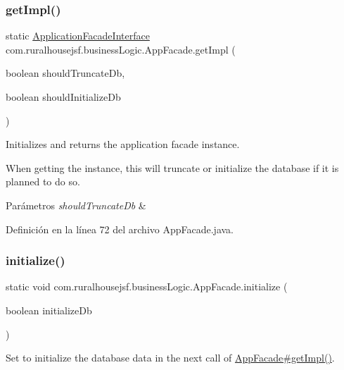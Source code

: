 \subsubsection{\texorpdfstring{getImpl()}{getImpl()}\hspace{0.1cm}{\footnotesize\ttfamily [3/3]}}
{\footnotesize\ttfamily static \mbox{\hyperlink{a00136}{Application\+Facade\+Interface}} com.\+ruralhousejsf.\+business\+Logic.\+App\+Facade.\+get\+Impl (\begin{DoxyParamCaption}\item[{boolean}]{should\+Truncate\+Db,  }\item[{boolean}]{should\+Initialize\+Db }\end{DoxyParamCaption})\hspace{0.3cm}{\ttfamily [static]}}



Initializes and returns the application facade instance. 

When getting the instance, this will truncate or initialize the database if it is planned to do so.


\begin{DoxyParams}{Parámetros}
{\em should\+Truncate\+Db} & \\
\hline
\end{DoxyParams}


Definición en la línea 72 del archivo App\+Facade.\+java.

\mbox{\label{a00128_a48252ec119a6bb16f5353df6ec6eff54}} 
\subsubsection{\texorpdfstring{initialize()}{initialize()}}
{\footnotesize\ttfamily static void com.\+ruralhousejsf.\+business\+Logic.\+App\+Facade.\+initialize (\begin{DoxyParamCaption}\item[{boolean}]{initialize\+Db }\end{DoxyParamCaption})\hspace{0.3cm}{\ttfamily [static]}}



Set to initialize the database data in the next call of \mbox{\hyperlink{a00128_a029bcceee98b9070b9f80abc54db45d6}{App\+Facade\#get\+Impl()}}. 


